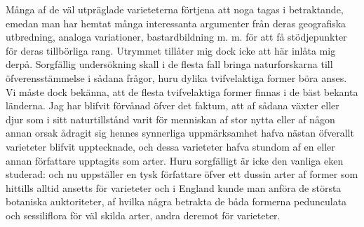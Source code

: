 Många af de väl utpräglade varieteterna förtjena att noga tagas i betraktande, emedan man har hemtat många interessanta argumenter från deras geografiska utbredning, analoga variationer, bastardbildning m. m. för att få stödjepunkter för deras tillbörliga rang. Utrymmet tillåter mig dock icke att här inlåta mig derpå. Sorgfällig undersökning skall i de flesta fall bringa naturforskarna till öfverensstämmelse i sådana frågor, huru dylika tvifvelaktiga former böra anses. Vi måste dock bekänna, att de flesta tvifvelaktiga former finnas i de bäst bekanta länderna. Jag har blifvit förvånad öfver det faktum, att af sådana växter eller djur som i sitt naturtillstånd varit för menniskan af stor nytta eller af någon annan orsak ådragit sig hennes synnerliga uppmärksamhet hafva nästan öfverallt varieteter blifvit upptecknade, och dessa varieteter hafva stundom af en eller annan författare upptagits som arter. Huru sorgfälligt är icke den vanliga eken studerad: och nu uppställer en tysk författare öfver ett dussin arter af former som hittills alltid ansetts för varieteter och i England kunde man anföra de största botaniska auktoriteter, af hvilka några betrakta de båda formerna pedunculata och sessiliflora för väl skilda arter, andra deremot för varieteter.

